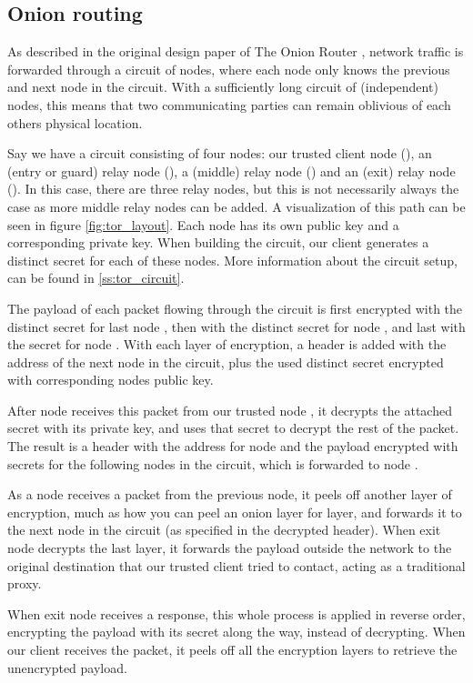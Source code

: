 \documentclass[12pt,journal,compsoc]{IEEEtran}
\begin{document}
	\subsection{Onion routing}
		As described in the original design paper of The Onion Router \cite{goldschlag1996hiding}, network traffic is forwarded through a circuit of nodes, where each node only knows the previous and next node in the circuit. With a sufficiently long circuit of (independent) nodes, this means that two communicating parties can remain oblivious of each others physical location.
		
		Say we have a circuit consisting of four nodes: our trusted client node (), an (entry or guard) relay node (), a (middle) relay node () and an (exit) relay node (). In this case, there are three relay nodes, but this is not necessarily always the case as more middle relay nodes can be added. A visualization of this path can be seen in figure \ref{fig:tor_layout}. Each node has its own public key and a corresponding private key. When building the circuit, our client generates a distinct secret for each of these nodes. More information about the circuit setup, can be found in \ref{ss:tor_circuit}.
		
		The payload of each packet flowing through the circuit is first encrypted with the distinct secret for last node , then with the distinct secret for node , and last with the secret for node . With each layer of encryption, a header is added with the address of the next node in the circuit, plus the used distinct secret encrypted with corresponding nodes public key. 
		
		After node  receives this packet from our trusted node , it decrypts the attached secret with its private key, and uses that secret to decrypt the rest of the packet. The result is a header with the address for node  and the payload encrypted with secrets for the following nodes in the circuit, which is forwarded to node .
		
		As a node receives a packet from the previous node, it peels off another layer of encryption, much as how you can peel an onion layer for layer, and forwards it to the next node in the circuit (as specified in the decrypted header). When exit node  decrypts the last layer, it forwards the payload outside the network to the original destination that our trusted client  tried to contact, acting as a traditional proxy.
		
		When exit node  receives a response, this whole process is applied in reverse order, encrypting the payload with its secret along the way, instead of decrypting. When our client  receives the packet, it peels off all the encryption layers to retrieve the unencrypted payload.
		
\end{document}
